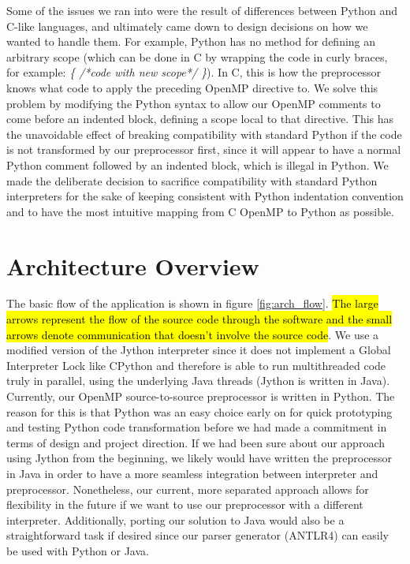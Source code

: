 \documentclass[letterpaper,12pt]{article} %
\begin{document}
Some of the issues we ran into were the result of differences between Python and C-like languages, and ultimately came down to design decisions on how we wanted to handle them. For example, Python has no method for defining an arbitrary scope (which can be done in C by wrapping the code in curly braces, for example: \textit{\{ /*code with new scope*/ \}}). In C, this is how the preprocessor knows what code to apply the preceding OpenMP directive to. We solve this problem by modifying the Python syntax to allow our OpenMP comments to come before an indented block, defining a scope local to that directive. This has the unavoidable effect of breaking compatibility with standard Python if the code is not transformed by our preprocessor first, since it will appear to have a normal Python comment followed by an indented block, which is illegal in Python. We made the deliberate decision to sacrifice compatibility with standard Python interpreters for the sake of keeping consistent with Python indentation convention and to have the most intuitive mapping from C OpenMP to Python as possible. 


\section{Architecture Overview}
The basic flow of the application is shown in figure \ref{fig:arch_flow}. \hl{The large arrows represent the flow of the source code through the software and the small arrows denote communication that doesn't involve the source code}. We use a modified version of the Jython interpreter since it does not implement a Global Interpreter Lock like CPython and therefore is able to run multithreaded code truly in parallel, using the underlying Java threads (Jython is written in Java). Currently, our OpenMP source-to-source preprocessor is written in Python. The reason for this is that Python was an easy choice early on for quick prototyping and testing Python code transformation before we had made a commitment in terms of design and project direction. If we had been sure about our approach using Jython from the beginning, we likely would have written the preprocessor in Java in order to have a more seamless integration between interpreter and preprocessor.  Nonetheless, our current, more separated approach allows for flexibility in the future if we want to use our preprocessor with a different interpreter. Additionally, porting our solution to Java would also be a straightforward task if desired since our parser generator (ANTLR4) can easily be used with Python or Java.
\end{document}

